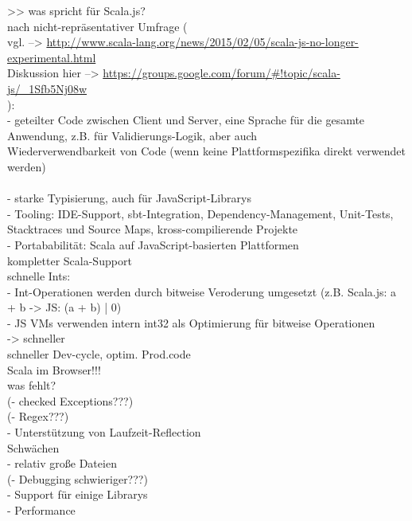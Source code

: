 \documentclass[a4paper, 12pt, hidelinks, listof=totoc, listoftables=totoc, bibliography=totoc]{scrreprt}
\begin{document}
>> was spricht für Scala.js? \\
    nach nicht-repräsentativer Umfrage ( \\
      vgl.  -->  \url{http://www.scala-lang.org/news/2015/02/05/scala-js-no-longer-experimental.html} \\
      Diskussion hier  -->  \url{https://groups.google.com/forum/#!topic/scala-js/_1Sfb5Nj08w} \\
    ): \\
    - geteilter Code zwischen Client und Server, eine Sprache für die gesamte Anwendung, z.B. für Validierungs-Logik, aber auch \\ Wiederverwendbarkeit von Code (wenn keine Plattformspezifika direkt verwendet werden) \\
    \cite{doeraene2013.CSJ} \\
    - starke Typisierung, auch für JavaScript-Librarys \\
    - Tooling: \ac{IDE}-Support, sbt-Integration, Dependency-Management, Unit-Tests, Stacktraces und Source Maps, kross-compilierende Projekte \\
    - Portababilität: Scala auf JavaScript-basierten Plattformen \\

  kompletter Scala-Support \\
  
  schnelle Ints: \\
  - Int-Operationen werden durch bitweise Veroderung umgesetzt (z.B. Scala.js: a + b -> JS: (a + b) | 0) \\
  - JS VMs verwenden intern int32 als Optimierung für bitweise Operationen \\
  -> schneller\cite{doeraene2015.SSP} \\


  schneller Dev-cycle, optim. Prod.code \\
  
  Scala im Browser!!! \\
  
  
was fehlt? \\
  (- checked Exceptions???) \\
  (- Regex???) \\
  - Unterstützung von Laufzeit-Reflection \\

Schwächen \\
  - relativ große Dateien \\
  (- Debugging schwieriger???) \\
  - Support für einige Librarys \\
  - Performance \\
  
\end{document}
